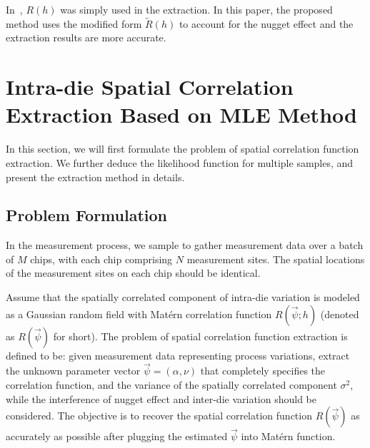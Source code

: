 \documentclass[referee]{ieice}
\begin{document}
In~\cite{Hargreaves08}, $R(h)$ was simply used in the extraction. In this paper,
the proposed method uses the modified form $\tilde{R}(h)$ to account for the nugget effect
and the extraction results are more accurate.

\section{Intra-die Spatial Correlation Extraction Based on MLE Method}
In this section, we will first formulate the problem of spatial correlation function extraction.
We further deduce the likelihood function for multiple samples, and present the extraction method in details.

\subsection{Problem Formulation}
In the measurement process, we sample to gather measurement data
over a batch of $M$ chips, with each chip comprising $N$ measurement sites.
The spatial locations of the measurement sites on each chip should be identical.

Assume that the spatially correlated component of intra-die variation is modeled as a Gaussian
random field with Mat\'{e}rn correlation function $R(\vec{\psi};h)$ (denoted as $R(\vec{\psi})$ for short).
The problem of spatial correlation function extraction is defined to be:
given measurement data representing process variations,
extract the unknown parameter vector $\vec{\psi}=(\alpha,\nu)$ that completely specifies the
correlation function, and the variance of the spatially correlated component $\sigma^2$,
while the interference of nugget effect and inter-die variation should be considered.
The objective is to recover the spatial correlation function $R(\vec{\psi})$
as accurately as possible after plugging the estimated $\vec{\psi}$ into Mat\'{e}rn function.
\end{document}
